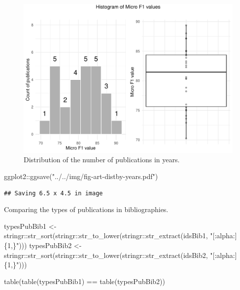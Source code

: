 \documentclass[
]{article}
\newenvironment{Shaded}{\begin{snugshade}}{\end{snugshade}}
\newcommand{\FunctionTok}[1]{\textcolor[rgb]{0.00,0.00,0.00}{#1}}
\newcommand{\NormalTok}[1]{#1}
\newcommand{\OtherTok}[1]{\textcolor[rgb]{0.56,0.35,0.01}{#1}}
\newcommand{\SpecialCharTok}[1]{\textcolor[rgb]{0.00,0.00,0.00}{#1}}
\newcommand{\StringTok}[1]{\textcolor[rgb]{0.31,0.60,0.02}{#1}}
\begin{document}
\begin{figure}

{\centering \includegraphics{../../img/fig-fmic-1} 

}

\caption{Distribution of the number of publications in years.}\label{fig:bibliochecking5}
\end{figure}

\begin{Shaded}
\begin{Highlighting}[]
\NormalTok{ggplot2}\SpecialCharTok{::}\FunctionTok{ggsave}\NormalTok{(}\StringTok{"../../img/fig{-}art{-}distby{-}years.pdf"}\NormalTok{)}
\end{Highlighting}
\end{Shaded}

\begin{verbatim}
## Saving 6.5 x 4.5 in image
\end{verbatim}

Comparing the types of publications in bibliographies.

\begin{Shaded}
\begin{Highlighting}[]
\NormalTok{typesPubBib1 }\OtherTok{\textless{}{-}}\NormalTok{ stringr}\SpecialCharTok{::}\FunctionTok{str\_sort}\NormalTok{(stringr}\SpecialCharTok{::}\FunctionTok{str\_to\_lower}\NormalTok{(stringr}\SpecialCharTok{::}\FunctionTok{str\_extract}\NormalTok{(idsBib1, }\StringTok{"[:alpha:]\{1,\}"}\NormalTok{)))}
\NormalTok{typesPubBib2 }\OtherTok{\textless{}{-}}\NormalTok{ stringr}\SpecialCharTok{::}\FunctionTok{str\_sort}\NormalTok{(stringr}\SpecialCharTok{::}\FunctionTok{str\_to\_lower}\NormalTok{(stringr}\SpecialCharTok{::}\FunctionTok{str\_extract}\NormalTok{(idsBib2, }\StringTok{"[:alpha:]\{1,\}"}\NormalTok{)))}

\FunctionTok{table}\NormalTok{(}\FunctionTok{table}\NormalTok{(typesPubBib1) }\SpecialCharTok{==} \FunctionTok{table}\NormalTok{(typesPubBib2))}
\end{Highlighting}
\end{Shaded}
\end{document}
